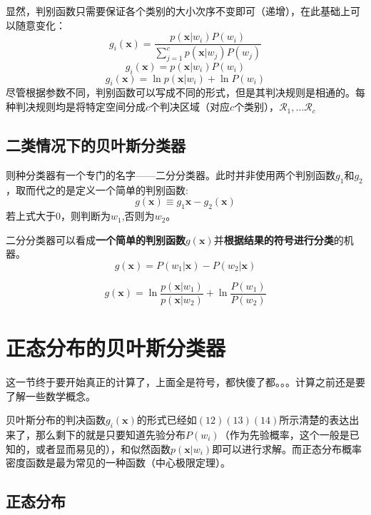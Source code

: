 \documentclass[12pt, letterpaper]{article}
\begin{document}
显然，判别函数只需要保证各个类别的大小次序不变即可（递增），在此基础上可以随意变化：
\begin{equation}
g_i(\mathbf{x})=\frac{p(\mathbf{x}|w_i)P(w_i)}{\sum_{j=1}^{c}p(\mathbf{x}|w_j)P(w_j)}
\end{equation}
\begin{equation}
g_i(\mathbf{x})=p(\mathbf{x}|w_i)P(w_i)
\end{equation}
\begin{equation}
g_i(\mathbf{x})=\ln{p(\mathbf{x}|w_i)}+\ln{P(w_i)}
\end{equation}
尽管根据参数不同，判别函数可以写成不同的形式，但是其判决规则是相通的。每种判决规则均是将特定空间分成$c$个判决区域（对应$c$个类别），$\mathscr{R}_1,\ldots \mathscr{R}_c$

\subsection{二类情况下的贝叶斯分类器}
则种分类器有一个专门的名字——二分分类器。此时并非使用两个判别函数$g_1$和$g_2$，取而代之的是定义一个简单的判别函数:
\begin{equation}
g(\mathbf{x})\equiv g_1{\mathbf{x}}-g_2(\mathbf{x})
\end{equation}
若上式大于0，则判断为$w_1$,否则为$w_2$。

二分分类器可以看成\textbf{一个简单的判别函数}$g(\mathbf{x})$并\textbf{根据结果的符号进行分类}的机器。
\begin{equation}
g(\mathbf{x})=P(w_1|\mathbf{x})-P(w_2|\mathbf{x})
\end{equation}

\begin{equation}
g(\mathbf{x})=\ln \frac{p(\mathbf{x}|w_1)}{p(\mathbf{x}|w_2)}+\ln \frac{P(w_1)}{P(w_2)}
\end{equation}

\section{正态分布的贝叶斯分类器}
这一节终于要开始真正的计算了，上面全是符号，都快傻了都。。。计算之前还是要了解一些数学概念。

贝叶斯分布的判决函数$g_i(\mathbf{x})$的形式已经如$(12)(13)(14)$所示清楚的表达出来了，那么剩下的就是只要知道先验分布$P(w_i)$（作为先验概率，这个一般是已知的，或者显而易见的），和似然函数$p(\mathbf{x}|w_i)$即可以进行求解。而正态分布概率密度函数是最为常见的一种函数（中心极限定理）。
\subsection{正态分布}
\end{document}
